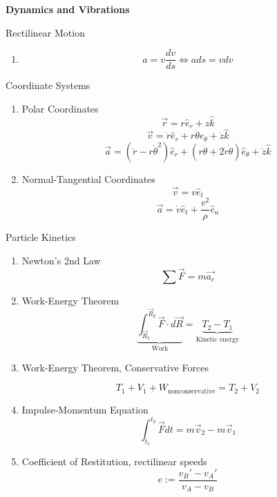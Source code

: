 \textbf{Dynamics and Vibrations}

\begin{multicols*}{2}[]
\vspace{-2em}
Rectilinear Motion
\vspace{-2em}
\begin{enumerate}
    \item[] \[a = v\frac{dv}{ds} \iff ads = vdv\]
\end{enumerate}
\vspace{-1em}
Coordinate Systems
\vspace{-1em}
\begin{enumerate}
    \item[] Polar Coordinates
\vspace{-1em}
    \[\vec{r} = r\hat e_r + z\hat k\]
\vspace{-1em}
    \[\vec{v} = \dot r\hat e_r + r\dot\theta \hat e_\theta + \dot z\hat k\]
\vspace{-1em}
    \[\vec{a} = (\ddot r - r\dot\theta^2)\hat e_r + (r\ddot\theta + 2\dot r\dot\theta)\hat e_\theta + \ddot z\hat k\]
\vspace{-1em}
    \item[] Normal-Tangential Coordinates
\vspace{-1em}
    \[\vec{v} = v\hat e_t\]
\vspace{-1em}
    \[\vec{a} = \dot v\hat e_t + \frac{v^2}{\rho}\hat e_n\]
\end{enumerate}
\vspace{-1em}
Particle Kinetics
\vspace{-1em}
\begin{enumerate}
    \item[] Newton's 2nd Law \[\sum \vec{F} = m\vec{a_c}\]

    \item[] Work-Energy Theorem \[\underbrace{\int_{\vec{R}_1}^{\vec{R}_2} \vec{F}\cdot d\vec{R}}_\text{Work} = \underbrace{T_2-T_1}_\text{Kinetic energy}\]

    \item[] Work-Energy Theorem, Conservative Forces

    \[T_1+V_1+W_\text{nonconservative} = T_2 +V_2\]

    \item[] Impulse-Momentum Equation \[\int_{t_1}^{t_2}\vec{F}dt = m\vec{v}_2 - m\vec{v}_1\]

    \item[] Coefficient of Restitution, rectilinear speeds \[e:=\frac{v_B' - v_A'}{v_A-v_B}\]
\end{enumerate}


\end{multicols*}
